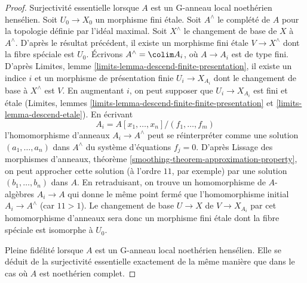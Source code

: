 \begin{proof}
\medskip\noindent
Surjectivité essentielle lorsque $A$ est un G-anneau local noethérien hensélien.
Soit $U_0 \to X_0$ un morphisme fini étale.
Soit $A^\wedge$ le complété de $A$ pour la topologie définie par l'idéal maximal.
Soit $X^\wedge$ le changement de base de $X$ à $A^\wedge$.
D'après le résultat précédent, il existe un morphisme fini étale
$V \to X^\wedge$ dont la fibre spéciale est $U_0$.
Écrivons $A^\wedge = \colim A_i$, où $A \to A_i$ est de type fini.
D'après Limites, lemme \ref{limits-lemma-descend-finite-presentation},
il existe un indice $i$ et un morphisme de présentation finie $U_i \to X_{A_i}$
dont le changement de base à $X^\wedge$ est $V$. En augmentant $i$,
on peut supposer que $U_i \to X_{A_i}$ est fini et étale
(Limites, lemmes \ref{limits-lemma-descend-finite-finite-presentation} et
\ref{limits-lemma-descend-etale}). En écrivant
$$
A_i = A[x_1, \ldots, x_n]/(f_1, \ldots, f_m)
$$
l'homomorphisme d'anneaux $A_i \to A^\wedge$ peut se réinterpréter comme une solution
$(a_1, \ldots, a_n)$ dans $A^\wedge$ du système d'équations $f_j = 0$.
D'après Lissage des morphismes d'anneaux, théorème \ref{smoothing-theorem-approximation-property},
on peut approcher cette solution (à l'ordre $11$, par exemple) par une solution
$(b_1, \ldots, b_n)$ dans $A$. En retraduisant, on trouve un homomorphisme de $A$-algèbres
$A_i \to A$ qui donne le même point fermé que l'homomorphisme initial
$A_i \to A^\wedge$ (car $11 > 1$). Le changement de base $U \to X$ de $V \to X_{A_i}$
par cet homomorphisme d'anneaux sera donc un morphisme fini étale dont la
fibre spéciale est isomorphe à $U_0$.

\medskip\noindent
Pleine fidélité lorsque $A$ est un G-anneau local noethérien hensélien.
Elle se déduit de la surjectivité essentielle exactement de la même
manière que dans le cas où $A$ est noethérien complet.


\end{proof}
